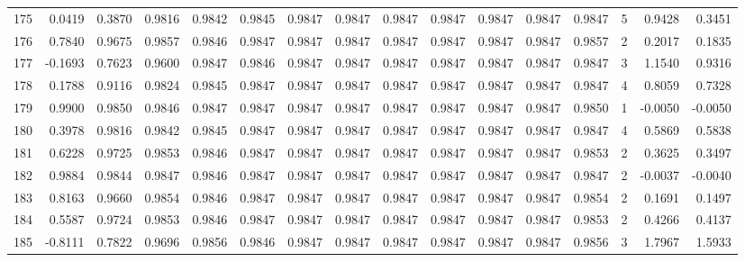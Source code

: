 \begin{tabular}{lrrrrrrrrrrrrrrr}
175 &      0.0419 &  0.3870 &  0.9816 &  0.9842 &  0.9845 &  0.9847 &  0.9847 &  0.9847 &  0.9847 &  0.9847 &   0.9847 &     0.9847 &      5 &                    0.9428 &                     0.3451 \\
176 &      0.7840 &  0.9675 &  0.9857 &  0.9846 &  0.9847 &  0.9847 &  0.9847 &  0.9847 &  0.9847 &  0.9847 &   0.9847 &     0.9857 &      2 &                    0.2017 &                     0.1835 \\
177 &     -0.1693 &  0.7623 &  0.9600 &  0.9847 &  0.9846 &  0.9847 &  0.9847 &  0.9847 &  0.9847 &  0.9847 &   0.9847 &     0.9847 &      3 &                    1.1540 &                     0.9316 \\
178 &      0.1788 &  0.9116 &  0.9824 &  0.9845 &  0.9847 &  0.9847 &  0.9847 &  0.9847 &  0.9847 &  0.9847 &   0.9847 &     0.9847 &      4 &                    0.8059 &                     0.7328 \\
179 &      0.9900 &  0.9850 &  0.9846 &  0.9847 &  0.9847 &  0.9847 &  0.9847 &  0.9847 &  0.9847 &  0.9847 &   0.9847 &     0.9850 &      1 &                   -0.0050 &                    -0.0050 \\
180 &      0.3978 &  0.9816 &  0.9842 &  0.9845 &  0.9847 &  0.9847 &  0.9847 &  0.9847 &  0.9847 &  0.9847 &   0.9847 &     0.9847 &      4 &                    0.5869 &                     0.5838 \\
181 &      0.6228 &  0.9725 &  0.9853 &  0.9846 &  0.9847 &  0.9847 &  0.9847 &  0.9847 &  0.9847 &  0.9847 &   0.9847 &     0.9853 &      2 &                    0.3625 &                     0.3497 \\
182 &      0.9884 &  0.9844 &  0.9847 &  0.9846 &  0.9847 &  0.9847 &  0.9847 &  0.9847 &  0.9847 &  0.9847 &   0.9847 &     0.9847 &      2 &                   -0.0037 &                    -0.0040 \\
183 &      0.8163 &  0.9660 &  0.9854 &  0.9846 &  0.9847 &  0.9847 &  0.9847 &  0.9847 &  0.9847 &  0.9847 &   0.9847 &     0.9854 &      2 &                    0.1691 &                     0.1497 \\
184 &      0.5587 &  0.9724 &  0.9853 &  0.9846 &  0.9847 &  0.9847 &  0.9847 &  0.9847 &  0.9847 &  0.9847 &   0.9847 &     0.9853 &      2 &                    0.4266 &                     0.4137 \\
185 &     -0.8111 &  0.7822 &  0.9696 &  0.9856 &  0.9846 &  0.9847 &  0.9847 &  0.9847 &  0.9847 &  0.9847 &   0.9847 &     0.9856 &      3 &                    1.7967 &                     1.5933 \\

\end{tabular}
